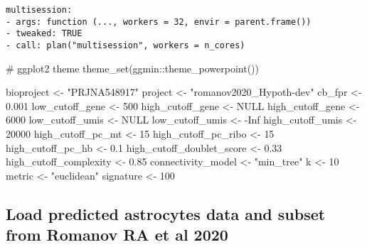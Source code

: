 \documentclass[
  letterpaper,
  DIV=11,
  numbers=noendperiod]{scrartcl}
\newenvironment{Shaded}{\begin{snugshade}}{\end{snugshade}}
\newcommand{\CommentTok}[1]{\textcolor[rgb]{0.37,0.37,0.37}{#1}}
\newcommand{\ConstantTok}[1]{\textcolor[rgb]{0.56,0.35,0.01}{#1}}
\newcommand{\DecValTok}[1]{\textcolor[rgb]{0.68,0.00,0.00}{#1}}
\newcommand{\FloatTok}[1]{\textcolor[rgb]{0.68,0.00,0.00}{#1}}
\newcommand{\FunctionTok}[1]{\textcolor[rgb]{0.28,0.35,0.67}{#1}}
\newcommand{\NormalTok}[1]{\textcolor[rgb]{0.00,0.23,0.31}{#1}}
\newcommand{\OtherTok}[1]{\textcolor[rgb]{0.00,0.23,0.31}{#1}}
\newcommand{\SpecialCharTok}[1]{\textcolor[rgb]{0.37,0.37,0.37}{#1}}
\newcommand{\StringTok}[1]{\textcolor[rgb]{0.13,0.47,0.30}{#1}}
\begin{document}
\begin{verbatim}
multisession:
- args: function (..., workers = 32, envir = parent.frame())
- tweaked: TRUE
- call: plan("multisession", workers = n_cores)
\end{verbatim}

\begin{Shaded}
\begin{Highlighting}[]
\CommentTok{\# ggplot2 theme}
\FunctionTok{theme\_set}\NormalTok{(ggmin}\SpecialCharTok{::}\FunctionTok{theme\_powerpoint}\NormalTok{())}
\end{Highlighting}
\end{Shaded}

\begin{Shaded}
\begin{Highlighting}[]
\NormalTok{bioproject }\OtherTok{\textless{}{-}} \StringTok{"PRJNA548917"}
\NormalTok{project }\OtherTok{\textless{}{-}} \StringTok{"romanov2020\_Hypoth{-}dev"}
\NormalTok{cb\_fpr }\OtherTok{\textless{}{-}} \FloatTok{0.001}
\NormalTok{low\_cutoff\_gene }\OtherTok{\textless{}{-}} \DecValTok{500}
\NormalTok{high\_cutoff\_gene }\OtherTok{\textless{}{-}} \ConstantTok{NULL}
\NormalTok{high\_cutoff\_gene }\OtherTok{\textless{}{-}} \DecValTok{6000}
\NormalTok{low\_cutoff\_umis }\OtherTok{\textless{}{-}} \ConstantTok{NULL}
\NormalTok{low\_cutoff\_umis }\OtherTok{\textless{}{-}} \SpecialCharTok{{-}}\ConstantTok{Inf}
\NormalTok{high\_cutoff\_umis }\OtherTok{\textless{}{-}} \DecValTok{20000}
\NormalTok{high\_cutoff\_pc\_mt }\OtherTok{\textless{}{-}} \DecValTok{15}
\NormalTok{high\_cutoff\_pc\_ribo }\OtherTok{\textless{}{-}} \DecValTok{15}
\NormalTok{high\_cutoff\_pc\_hb }\OtherTok{\textless{}{-}} \FloatTok{0.1}
\NormalTok{high\_cutoff\_doublet\_score }\OtherTok{\textless{}{-}} \FloatTok{0.33}
\NormalTok{high\_cutoff\_complexity }\OtherTok{\textless{}{-}} \FloatTok{0.85}
\NormalTok{connectivity\_model }\OtherTok{\textless{}{-}} \StringTok{"min\_tree"}
\NormalTok{k }\OtherTok{\textless{}{-}} \DecValTok{10}
\NormalTok{metric }\OtherTok{\textless{}{-}} \StringTok{"euclidean"}
\NormalTok{signature }\OtherTok{\textless{}{-}} \DecValTok{100}
\end{Highlighting}
\end{Shaded}

\hypertarget{load-predicted-astrocytes-data-and-subset-from-romanov-ra-et-al-2020}{%
\subsection{Load predicted astrocytes data and subset from Romanov RA et
al
2020}\label{load-predicted-astrocytes-data-and-subset-from-romanov-ra-et-al-2020}}
\end{document}
